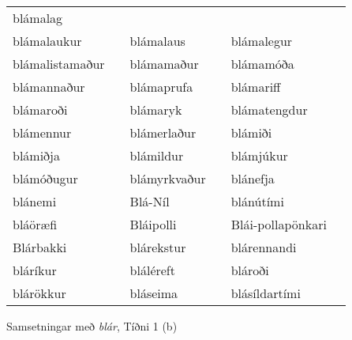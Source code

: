 \documentclass[../samsetningasafn.tex]{subfiles}
\begin{document}
\begin{wordlist}[H]
\begin{tcolorbox}
\begin{tabular}{BlBlBl}
		blámalag		&		\\  %
		blámalaukur		&		& 
		blámalaus		&		& 
		blámalegur		&		\\  %
		blámalistamaður	&		& 
		blámamaður		&		& 
		blámamóða		&		\\  %
		blámannaður	&		& 
		blámaprufa		&		& 
		blámariff		&		\\  %
		blámaroði		&		& 
		blámaryk		&		& 
		blámatengdur	&		\\  %
		blámennur		&		& 
		blámerlaður		&		& 
		blámiði			&		\\  %
		blámiðja			&		& 
		blámildur		&		& 
		blámjúkur		&		\\  %
		blámóðugur		&		& 
		blámyrkvaður	&		& 
		blánefja			&		\\  %
		blánemi			&		& 
		Blá-Níl			&		& 
		blánútími		&		\\  %
		bláöræfi			&		& 
		Bláipolli			&		& 
		Blái-pollapönkari	&		\\  %
		Blárbakki		&		& 
		blárekstur		&		& 
		blárennandi		&		\\  %
		bláríkur			&		& 
		bláléreft			&		& 
		blároði			&		\\  %
		blárökkur		&		& 
		bláseima		&		& 
		blásíldartími		&		  %
	\end{tabular}

\end{tcolorbox}
	\caption{Samsetningar með \textit{blár}, Tíðni 1 (b)}
	\label{listi:blatt.1b}
\end{wordlist}		
\end{document}
